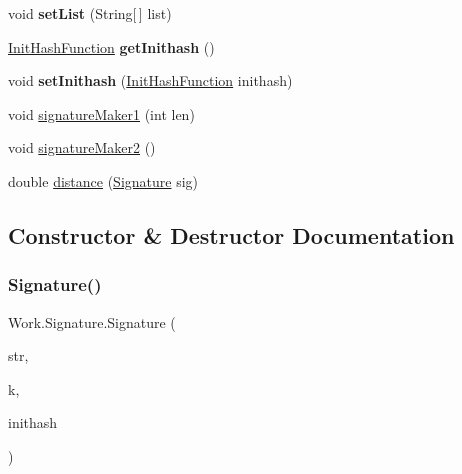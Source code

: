 \begin{DoxyCompactItemize}
\mbox{\label{classWork_1_1Signature_a2a4ba3c89fa812e3a06c129b03c89a7b}} 
void {\bfseries set\+List} (String\mbox{[}$\,$\mbox{]} list)
\item 
\mbox{\label{classWork_1_1Signature_a8e042a603f8defd11faf4f4714673222}} 
\hyperlink{classWork_1_1InitHashFunction}{Init\+Hash\+Function} {\bfseries get\+Inithash} ()
\item 
\mbox{\label{classWork_1_1Signature_a9cc93c1c44aa422c23c37f6a40fe6777}} 
void {\bfseries set\+Inithash} (\hyperlink{classWork_1_1InitHashFunction}{Init\+Hash\+Function} inithash)
\item 
void \hyperlink{classWork_1_1Signature_a3218bc735a71d8c3cfd900484b183096}{signature\+Maker1} (int len)
\item 
void \hyperlink{classWork_1_1Signature_aa9ef78ee15edc026f57350b1ee67034a}{signature\+Maker2} ()
\item 
double \hyperlink{classWork_1_1Signature_a5253f0bbfbe089155ce1cc0538e15594}{distance} (\hyperlink{classWork_1_1Signature}{Signature} sig)
\end{DoxyCompactItemize}


\subsection{Constructor \& Destructor Documentation}
\mbox{\label{classWork_1_1Signature_a3df52c35d659fa6051c9b2811e44cb40}} 
\subsubsection{\texorpdfstring{Signature()}{Signature()}\hspace{0.1cm}{\footnotesize\ttfamily [1/2]}}
{\footnotesize\ttfamily Work.\+Signature.\+Signature (\begin{DoxyParamCaption}\item[{String}]{str,  }\item[{int}]{k,  }\item[{\hyperlink{classWork_1_1InitHashFunction}{Init\+Hash\+Function}}]{inithash }\end{DoxyParamCaption})\hspace{0.3cm}{\ttfamily [inline]}}

